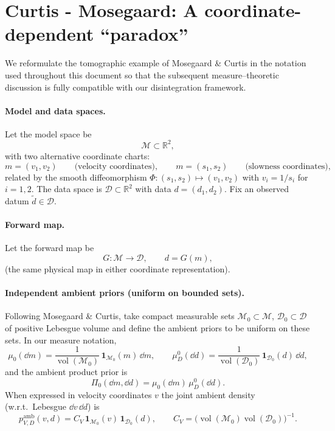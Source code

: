 \documentclass[11pt]{article}
\theoremstyle{remark}
\newcommand{\modelspace}{\mathcal{M}}
\newcommand{\dataspace}{\mathcal{D}}
\begin{document}
\section{Curtis - Mosegaard: A coordinate-dependent ``paradox''}
\label{subsec:coordinate-paradox}

We reformulate the tomographic example of Mosegaard \& Curtis in the notation
used throughout this document so that the subsequent measure--theoretic
discussion is fully compatible with our disintegration framework.

\paragraph{Model and data spaces.}
Let the model space be
\[
\modelspace\subset\mathbb{R}^2,
\]
with two alternative coordinate charts:
\[
m=(v_1,v_2)\qquad\text{(velocity coordinates)},\qquad
m=(s_1,s_2)\qquad\text{(slowness coordinates),}
\]
related by the smooth diffeomorphism \(\Phi:(s_1,s_2)\mapsto (v_1,v_2)\)
with \(v_i=1/s_i\) for \(i=1,2\). The data space is
\(\dataspace\subset\mathbb{R}^2\) with data \(d=(d_1,d_2)\). Fix an observed
datum \(\tilde d\in\dataspace\).

\paragraph{Forward map.}
Let the forward map be
\[
G:\modelspace\to\dataspace,\qquad d=G(m),
\]
(the same physical map in either coordinate representation).

\paragraph{Independent ambient priors (uniform on bounded sets).}
Following Mosegaard \& Curtis, take compact measurable sets
\(\modelspace_0\subset\modelspace\), \(\dataspace_0\subset\dataspace\) of
positive Lebesgue volume and define the ambient priors to be uniform on these
sets. In our measure notation,
\[
\mu_0(\dd m)=\frac{1}{\operatorname{vol}(\modelspace_0)}\,\mathbf{1}_{\modelspace_0}(m)\,\dd m,
\qquad
\mu_{D}^0(\dd d)=\frac{1}{\operatorname{vol}(\dataspace_0)}\,\mathbf{1}_{\dataspace_0}(d)\,\dd d,
\]
and the ambient product prior is
\[
\Pi_0(\dd m,\dd d)=\mu_0(\dd m)\,\mu_{D}^0(\dd d).
\]
When expressed in velocity coordinates \(v\) the joint ambient density (w.r.t.\
Lebesgue \(\dd v\,\dd d\)) is
\begin{equation}\label{eq:joint_CM}
p_{V,D}^{\mathrm{amb}}(v,d)=C_V\,\mathbf{1}_{\modelspace_0}(v)\,\mathbf{1}_{\dataspace_0}(d),
\qquad
C_V=\big(\operatorname{vol}(\modelspace_0)\operatorname{vol}(\dataspace_0)\big)^{-1}.
\end{equation}
\end{document}
